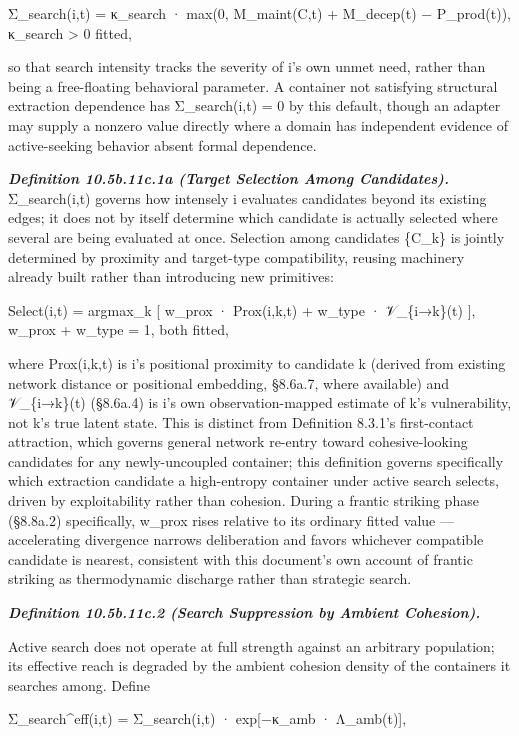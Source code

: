 \documentclass[
]{article}
\begin{document}
Σ\_search(i,t) = κ\_search · max(0, M\_maint(C,t) + M\_decep(t) −
P\_prod(t)), κ\_search \textgreater{} 0 fitted,

so that search intensity tracks the severity of i's own unmet need,
rather than being a free-floating behavioral parameter. A container not
satisfying structural extraction dependence has Σ\_search(i,t) = 0 by
this default, though an adapter may supply a nonzero value directly
where a domain has independent evidence of active-seeking behavior
absent formal dependence.

\emph{\textbf{Definition 10.5b.11c.1a (Target Selection Among
Candidates).}} Σ\_search(i,t) governs how intensely i evaluates
candidates beyond its existing edges; it does not by itself determine
which candidate is actually selected where several are being evaluated
at once. Selection among candidates \{C\_k\} is jointly determined by
proximity and target-type compatibility, reusing machinery already built
rather than introducing new primitives:

Select(i,t) = argmax\_k {[} w\_prox · Prox(i,k,t) + w\_type ·
𝒱\_\{i→k\}(t) {]}, w\_prox + w\_type = 1, both fitted,

where Prox(i,k,t) is i's positional proximity to candidate k (derived
from existing network distance or positional embedding, §8.6a.7, where
available) and 𝒱\_\{i→k\}(t) (§8.6a.4) is i's own observation-mapped
estimate of k's vulnerability, not k's true latent state. This is
distinct from Definition 8.3.1's first-contact attraction, which governs
general network re-entry toward cohesive-looking candidates for any
newly-uncoupled container; this definition governs specifically which
extraction candidate a high-entropy container under active search
selects, driven by exploitability rather than cohesion. During a frantic
striking phase (§8.8a.2) specifically, w\_prox rises relative to its
ordinary fitted value --- accelerating divergence narrows deliberation
and favors whichever compatible candidate is nearest, consistent with
this document's own account of frantic striking as thermodynamic
discharge rather than strategic search.

\emph{\textbf{Definition 10.5b.11c.2 (Search Suppression by Ambient
Cohesion).}}

Active search does not operate at full strength against an arbitrary
population; its effective reach is degraded by the ambient cohesion
density of the containers it searches among. Define

Σ\_search\^{}eff(i,t) = Σ\_search(i,t) · exp{[}−κ\_amb · Λ\_amb(t){]},
\end{document}
